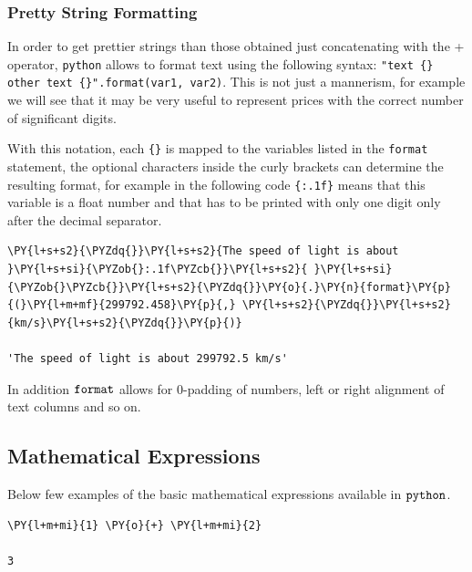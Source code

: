 \subsubsection{Pretty String Formatting}
In order to get prettier strings than those obtained just concatenating with the + operator, \texttt{python} allows to format text using the following syntax: \texttt{"text \{\} other text \{\}".format(var1, var2)}.
This is not just a mannerism, for example we will see that it may be very useful to represent prices with the correct 
number of significant digits.

With this notation, each \texttt{\{\}} is mapped to the variables listed in the \texttt{format} statement, the optional characters inside the curly brackets can determine the resulting format, for example in the following code \texttt{\{:.1f\}} means that this variable is a float number and that has to be printed with only one digit only after the decimal separator. 

\begin{codebox}[breakable, size=fbox, boxrule=1pt, pad at break*=1mm, colback=cellbackground, colframe=cellborder]            
\begin{Verbatim}[commandchars=\\\{\}]
\PY{l+s+s2}{\PYZdq{}}\PY{l+s+s2}{The speed of light is about }\PY{l+s+si}{\PYZob{}:.1f\PYZcb{}}\PY{l+s+s2}{ }\PY{l+s+si}{\PYZob{}\PYZcb{}}\PY{l+s+s2}{\PYZdq{}}\PY{o}{.}\PY{n}{format}\PY{p}{(}\PY{l+m+mf}{299792.458}\PY{p}{,} \PY{l+s+s2}{\PYZdq{}}\PY{l+s+s2}{km/s}\PY{l+s+s2}{\PYZdq{}}\PY{p}{)}

'The speed of light is about 299792.5 km/s'
\end{Verbatim}
\end{codebox}

In addition $\tt{format}$ allows for 0-padding of numbers, left or right alignment of text columns and so on.

\subsection{Mathematical Expressions}\label{mathematical-expressions}

Below few examples of the basic mathematical expressions available in $\tt{python}$.

\begin{codebox}[breakable, size=fbox, boxrule=1pt, pad at break*=1mm, colback=cellbackground, colframe=cellborder]            
\begin{Verbatim}[commandchars=\\\{\}]
\PY{l+m+mi}{1} \PY{o}{+} \PY{l+m+mi}{2}

3
\end{Verbatim}
\end{codebox}

